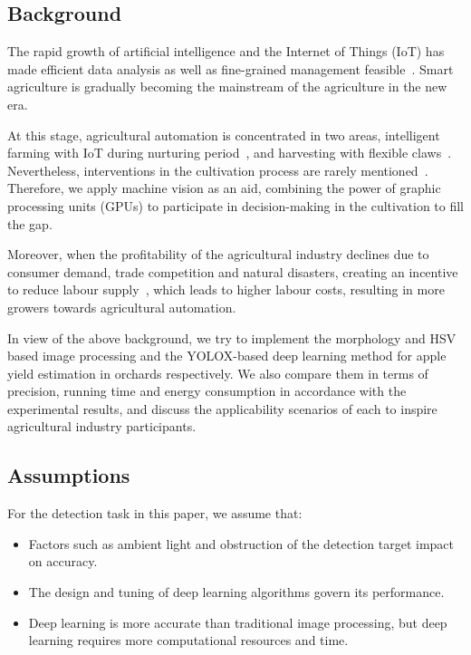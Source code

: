 \subsection{Background}
The rapid growth of artificial intelligence and the Internet of Things (IoT) has made efficient data analysis as well as fine-grained management feasible~\citep{Liu2021}. Smart agriculture is gradually becoming the mainstream of the agriculture in the new era.

At this stage, agricultural automation is concentrated in two areas, intelligent farming with IoT during nurturing period~\citep{ZamoraIzquierdo2019}, and harvesting with flexible claws~\citep{Li2021}. Nevertheless, interventions in the cultivation process are rarely mentioned~\citep{Debnath2022}. Therefore, we apply machine vision as an aid, combining the power of graphic processing units (GPUs) to participate in decision-making in the cultivation to fill the gap.

Moreover, when the profitability of the agricultural industry declines due to consumer demand, trade competition and natural disasters, creating an incentive to reduce labour supply~\citep{Calvin2010}, which leads to higher labour costs, resulting in more growers towards agricultural automation.  

In view of the above background, we try to implement the morphology and HSV based image processing and the YOLOX-based deep learning method for apple yield estimation in orchards respectively. We also compare them in terms of precision, running time and energy consumption in accordance with the experimental results, and discuss the applicability scenarios of each to inspire agricultural industry participants.


\subsection{Assumptions}
For the detection task in this paper, we assume that:
\begin{itemize}
    \item Factors such as ambient light and obstruction of the detection target impact on accuracy.
    \item The design and tuning of deep learning algorithms govern its performance.
    \item Deep learning is more accurate than traditional image processing, but deep learning requires more computational resources and time.
\end{itemize}

